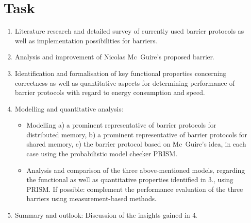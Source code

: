 \documentclass[a4paper, 10pt]{article}
\begin{document}
\section*{Task}
\label{sec:task}
\begin{enumerate}
	\item Literature research and detailed survey of currently used barrier protocols as well as implementation possibilities for barriers.
	\item Analysis and improvement of Nicolas Mc~Guire's proposed barrier.
	\item Identification and formalisation of key functional properties concerning correctness as well as quantitative aspects for determining performance of barrier protocols with regard to energy consumption and speed.
		\item Modelling and quantitative analysis:
			\begin{itemize}
				\item Modelling a) a prominent representative of barrier protocols for distributed memory, b) a prominent representative of barrier protocols for shared memory, c) the barrier protocol based on Mc~Guire's idea, in each case using the probabilistic model checker PRISM.
				\item Analysis and comparison of the three above-mentioned models, regarding the functional as well as quantitative properties identified in 3., using PRISM. If possible: complement the performance evaluation of the three barriers using measurement-based methods.
			\end{itemize}
		\item Summary and outlook: Discussion of the insights gained in 4.
\end{enumerate}

\pagebreak
\newpage \thispagestyle{empty} \mbox{}
\pagebreak

\thispagestyle{empty}

\end{document}
